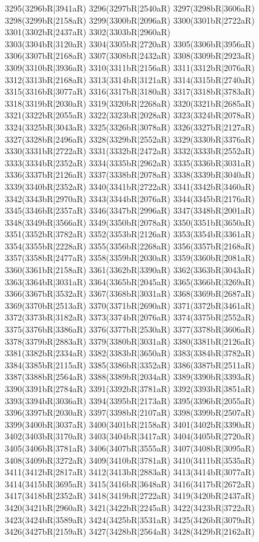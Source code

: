 3295(3296bR|3941aR) 3296(3297bR|2540aR) 3297(3298bR|3606aR) 3298(3299bR|2158aR) 3299(3300bR|2096aR) 3300(3301bR|2722aR) 3301(3302bR|2437aR) 3302(3303bR|2960aR) \\3303(3304bR|3120aR) 3304(3305bR|2720aR) 3305(3306bR|3956aR) 3306(3307bR|2168aR) 3307(3308bR|2432aR) 3308(3309bR|2923aR) 3309(3310bR|3936aR) 3310(3311bR|2156aR) 3311(3312bR|2076aR) \\3312(3313bR|2168aR) 3313(3314bR|3121aR) 3314(3315bR|2740aR) 3315(3316bR|3077aR) 3316(3317bR|3180aR) 3317(3318bR|3783aR) 3318(3319bR|2030aR) 3319(3320bR|2268aR) 3320(3321bR|2685aR) \\3321(3322bR|2055aR) 3322(3323bR|2028aR) 3323(3324bR|2078aR) 3324(3325bR|3043aR) 3325(3326bR|3078aR) 3326(3327bR|2127aR) 3327(3328bR|2496aR) 3328(3329bR|2552aR) 3329(3330bR|3376aR) \\3330(3331bR|2722aR) 3331(3332bR|2472aR) 3332(3333bR|2552aR) 3333(3334bR|2352aR) 3334(3335bR|2962aR) 3335(3336bR|3031aR) 3336(3337bR|2126aR) 3337(3338bR|2078aR) 3338(3339bR|3040aR) \\3339(3340bR|2352aR) 3340(3341bR|2722aR) 3341(3342bR|3460aR) 3342(3343bR|2970aR) 3343(3344bR|2076aR) 3344(3345bR|2176aR) 3345(3346bR|2357aR) 3346(3347bR|2996aR) 3347(3348bR|2001aR) \\3348(3349bR|3566aR) 3349(3350bR|2078aR) 3350(3351bR|3650aR) 3351(3352bR|3782aR) 3352(3353bR|2126aR) 3353(3354bR|3361aR) 3354(3355bR|2228aR) 3355(3356bR|2268aR) 3356(3357bR|2168aR) \\3357(3358bR|2477aR) 3358(3359bR|2030aR) 3359(3360bR|2081aR) 3360(3361bR|2158aR) 3361(3362bR|3390aR) 3362(3363bR|3043aR) 3363(3364bR|3031aR) 3364(3365bR|2045aR) 3365(3366bR|3269aR) \\3366(3367bR|3532aR) 3367(3368bR|3031aR) 3368(3369bR|2687aR) 3369(3370bR|2513aR) 3370(3371bR|2690aR) 3371(3372bR|3461aR) 3372(3373bR|3182aR) 3373(3374bR|2076aR) 3374(3375bR|2552aR) \\3375(3376bR|3386aR) 3376(3377bR|2530aR) 3377(3378bR|3606aR) 3378(3379bR|2883aR) 3379(3380bR|3031aR) 3380(3381bR|2126aR) 3381(3382bR|2334aR) 3382(3383bR|3650aR) 3383(3384bR|3782aR) \\3384(3385bR|2115aR) 3385(3386bR|3352aR) 3386(3387bR|2511aR) 3387(3388bR|2564aR) 3388(3389bR|2034aR) 3389(3390bR|3393aR) 3390(3391bR|2784aR) 3391(3392bR|3781aR) 3392(3393bR|3851aR) \\3393(3394bR|3036aR) 3394(3395bR|2173aR) 3395(3396bR|2055aR) 3396(3397bR|2030aR) 3397(3398bR|2107aR) 3398(3399bR|2507aR) 3399(3400bR|3037aR) 3400(3401bR|2158aR) 3401(3402bR|3390aR) \\3402(3403bR|3170aR) 3403(3404bR|3417aR) 3404(3405bR|2720aR) 3405(3406bR|3781aR) 3406(3407bR|3555aR) 3407(3408bR|3095aR) 3408(3409bR|3272aR) 3409(3410bR|3781aR) 3410(3411bR|3535aR) \\3411(3412bR|2817aR) 3412(3413bR|2883aR) 3413(3414bR|3077aR) 3414(3415bR|3695aR) 3415(3416bR|3648aR) 3416(3417bR|2672aR) 3417(3418bR|2352aR) 3418(3419bR|2722aR) 3419(3420bR|2437aR) \\3420(3421bR|2960aR) 3421(3422bR|2245aR) 3422(3423bR|3722aR) 3423(3424bR|3589aR) 3424(3425bR|3531aR) 3425(3426bR|3079aR) 3426(3427bR|2159aR) 3427(3428bR|2564aR) 3428(3429bR|2162aR) 